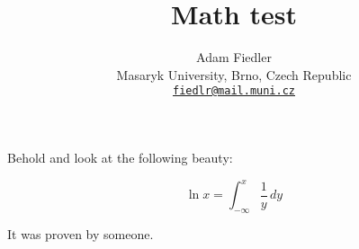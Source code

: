 \documentclass[a4paper]{article}
\title{
    Math test
}
\author{
    Adam Fiedler\\
    \small
    Masaryk University, Brno, Czech Republic\\
    \small
    \texttt{\href{mailto:fiedlr@mail.muni.cz}{fiedlr@mail.muni.cz}}
}
\date{}
\begin{document}
\maketitle

Behold and look at the following beauty:

$$ \ln x = \int_{-\infty}^x \frac 1 y \, dy  $$

It was proven by someone\cite{someone}.



\end{document}
